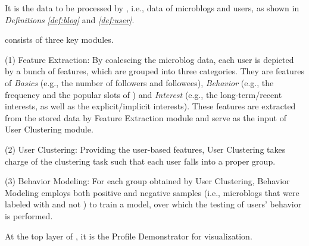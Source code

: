  It is the data to be processed by \sys{}, i.e., data of microblogs and users, as shown in \textit{Definitions} \textit{\ref{def:blog}} and \textit{\ref{def:user}}.

\sys{} consists of three key modules.

	\stab(1)  Feature Extraction: By coalescing the microblog data, each user is depicted by a bunch of features, which are grouped into three categories. They are features of \textit{Basics} (e.g., the number of followers and followees), \textit{Behavior} (e.g., the frequency and the popular slots of \retg{}) and \textit{Interest} (e.g., the long-term/recent interests, as well as the explicit/implicit interests). These features are extracted from the stored data by Feature Extraction module and serve as the input of User Clustering module.
	
	\stab(2)  User Clustering: Providing the user-based features, User Clustering takes charge of the clustering task such that each user falls into a proper group.
	
	\stab(3)  Behavior Modeling: For each group obtained by User Clustering, Behavior Modeling employs both positive and negative samples (i.e., microblogs that were labeled with \retd{} and not \retd{}) to train a model, over which the testing of users' \retg{} behavior is performed.
	
 At the top layer of \sys{}, it is the Profile Demonstrator for visualization.



